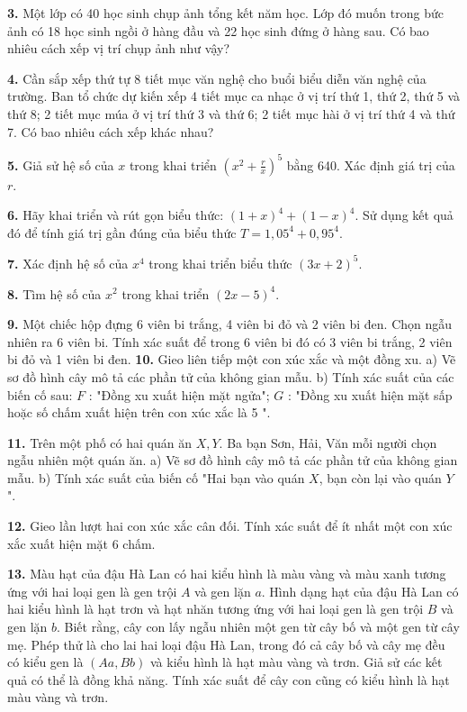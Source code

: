 \documentclass[12pt,a4paper]{extarticle}
\begin{document}
\vspace{0.4cm}
\noindent\textbf{3.} Một lớp có 40 học sinh chụp ảnh tổng kết năm học. Lớp đó muốn trong bức ảnh có 18 học sinh ngồi ở hàng đầu và 22 học sinh đứng ở hàng sau. Có bao nhiêu cách xếp vị trí chụp ảnh như vậy?

\vspace{0.4cm}
\noindent\textbf{4.} Cần sắp xếp thứ tự 8 tiết mục văn nghệ cho buổi biểu diễn văn nghệ của trường. Ban tổ chức dự kiến xếp 4 tiết mục ca nhạc ở vị trí thứ 1, thứ 2, thứ 5 và thứ 8; 2 tiết mục múa ở vị trí thứ 3 và thứ 6; 2 tiết mục hài ở vị trí thứ 4 và thứ 7. Có bao nhiêu cách xếp khác nhau?

\noindent\textbf{5.} Giả sử hệ số của $x$ trong khai triển $\left(x^2 + \frac{r}{x}\right)^5$ bằng 640. Xác định giá trị của $r$.

\noindent\textbf{6.} Hãy khai triển và rút gọn biểu thức: $(1 + x)^4 + (1 - x)^4$. Sử dụng kết quả đó để tính giá trị gần đúng của biểu thức $T = 1{,}05^4 + 0{,}95^4$.

\noindent\textbf{7.} Xác định hệ số của $x^4$ trong khai triển biểu thức $(3x + 2)^5$.

\noindent\textbf{8.} Tìm hệ số của $x^2$ trong khai triển $(2x - 5)^4$.

\noindent\textbf{9.} Một chiếc hộp đựng 6 viên bi trắng, 4 viên bi đỏ và 2 viên bi đen. Chọn ngẫu nhiên ra 6 viên bi. Tính xác suất để trong 6 viên bi đó có 3 viên bi trắng, 2 viên bi đỏ và 1 viên bi đen.
\vspace{0.4cm}
\noindent\textbf{10.} Gieo liên tiếp một con xúc xắc và một đồng xu.
\noindent a) Vẽ sơ đồ hình cây mô tả các phần tử của không gian mẫu.
\noindent b) Tính xác suất của các biến cố sau:
\noindent $F$ : "Đồng xu xuất hiện mặt ngửa";
\noindent $G$ : "Đồng xu xuất hiện mặt sấp hoặc số chấm xuất hiện trên con xúc xắc là 5 ".
\vspace{0.4cm}

\noindent\textbf{11.} Trên một phố có hai quán ăn $X, Y$. Ba bạn Sơn, Hải, Văn mỗi người chọn ngẫu nhiên một quán ăn.
\noindent a) Vẽ sơ đồ hình cây mô tả các phần tử của không gian mẫu.
\noindent b) Tính xác suất của biến cố "Hai bạn vào quán $X$, bạn còn lại vào quán $Y$ ".
\vspace{0.4cm}

\noindent\textbf{12.} Gieo lần lượt hai con xúc xắc cân đối. Tính xác suất để ít nhất một con xúc xắc xuất hiện mặt 6 chấm.
\vspace{0.4cm}

\noindent\textbf{13.} Màu hạt của đậu Hà Lan có hai kiểu hình là màu vàng và màu xanh tương ứng với hai loại gen là gen trội $A$ và gen lặn $a$. Hình dạng hạt của đậu Hà Lan có hai kiểu hình là hạt trơn và hạt nhăn tương ứng với hai loại gen là gen trội $B$ và gen lặn $b$. Biết rằng, cây con lấy ngẫu nhiên một gen từ cây bố và một gen từ cây mẹ.
\noindent Phép thử là cho lai hai loại đậu Hà Lan, trong đó cả cây bố và cây mẹ đều có kiểu gen là $(Aa, Bb)$ và kiểu hình là hạt màu vàng và trơn. Giả sử các kết quả có thể là đồng khả năng. Tính xác suất để cây con cũng có kiểu hình là hạt màu vàng và trơn.
\end{document}
